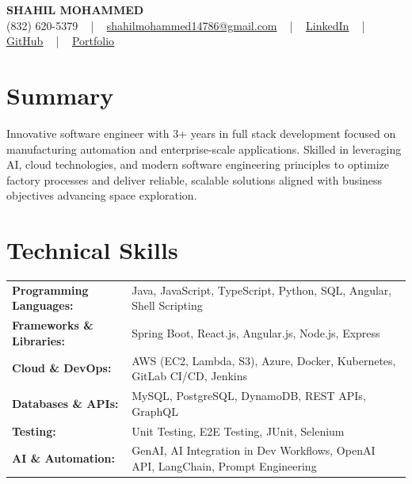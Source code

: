 \documentclass[letterpaper,11pt]{article}
\begin{document}
\begin{center}
    {\fontsize{14pt}{12pt}\selectfont \textbf{\MakeUppercase{Shahil Mohammed}}}\\ \vspace{2pt}
    \fontsize{10pt}{12pt}\selectfont (832) 620-5379 ~ | ~ \href{mailto:shahilmohammed14786@gmail.com}{shahilmohammed14786@gmail.com} ~ | ~  
    \href{https://www.linkedin.com/in/shahil-mohammed-9652931a1/}{\color{blue}\underline{LinkedIn}}  ~ | ~ 
    \href{https://github.com/freakbeast14}{\color{blue}\underline{GitHub}} ~ | ~ 
    \href{https://shahil-mohammed.netlify.app/}{\color{blue}\underline{Portfolio}}
    \vspace{-8pt}
\end{center}

\section{Summary}
\fontsize{9pt}{10pt}\selectfont
Innovative software engineer with 3+ years in full stack development focused on manufacturing automation and enterprise-scale applications. Skilled in leveraging AI, cloud technologies, and modern software engineering principles to optimize factory processes and deliver reliable, scalable solutions aligned with business objectives advancing space exploration.
 \vspace{-5pt}
 
\section{Technical Skills}
        \vspace{-14pt}
        \begin{table}[h]
            \fontsize{9pt}{10pt}\selectfont
            \begin{tabular}{p{0.3\linewidth} p{0.7\linewidth}}
                \textbf{Programming Languages:} & Java, JavaScript, TypeScript, Python, SQL, Angular, Shell Scripting \\
                \textbf{Frameworks \& Libraries:} & Spring Boot, React.js, Angular.js, Node.js, Express \\
                \textbf{Cloud \& DevOps:} & AWS (EC2, Lambda, S3), Azure, Docker, Kubernetes, GitLab CI/CD, Jenkins \\
                \textbf{Databases \& APIs:} & MySQL, PostgreSQL, DynamoDB, REST APIs, GraphQL \\
                \textbf{Testing:} & Unit Testing, E2E Testing, JUnit, Selenium \\
                \textbf{AI \& Automation:} & GenAI, AI Integration in Dev Workflows, OpenAI API, LangChain, Prompt Engineering \\
            \end{tabular}
        \end{table}
 \vspace{-15pt}
 
\end{document}
